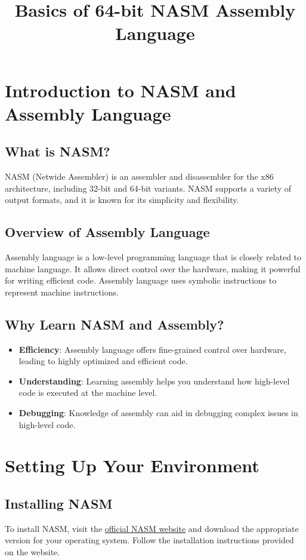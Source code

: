 \documentclass{article}
\begin{document}
\title{Basics of 64-bit NASM Assembly Language}
\author{}
\date{}
\maketitle

\section{Introduction to NASM and Assembly Language}

\subsection{What is NASM?}
NASM (Netwide Assembler) is an assembler and disassembler for the x86 architecture, including 32-bit and 64-bit variants. NASM supports a variety of output formats, and it is known for its simplicity and flexibility.

\subsection{Overview of Assembly Language}
Assembly language is a low-level programming language that is closely related to machine language. It allows direct control over the hardware, making it powerful for writing efficient code. Assembly language uses symbolic instructions to represent machine instructions.

\subsection{Why Learn NASM and Assembly?}
\begin{itemize}
    \item \textbf{Efficiency}: Assembly language offers fine-grained control over hardware, leading to highly optimized and efficient code.
    \item \textbf{Understanding}: Learning assembly helps you understand how high-level code is executed at the machine level.
    \item \textbf{Debugging}: Knowledge of assembly can aid in debugging complex issues in high-level code.
\end{itemize}

\section{Setting Up Your Environment}

\subsection{Installing NASM}
To install NASM, visit the \href{https://www.nasm.us/}{official NASM website} and download the appropriate version for your operating system. Follow the installation instructions provided on the website.
\end{document}
